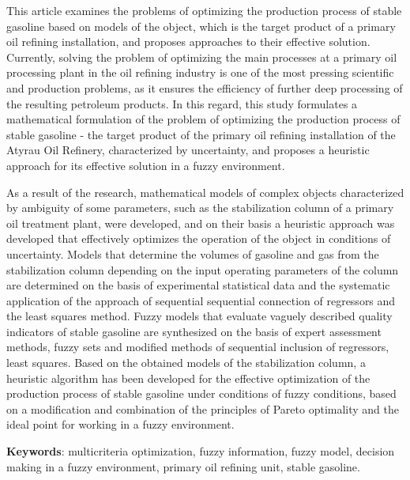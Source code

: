 This article examines the problems of optimizing the production process
of stable gasoline based on models of the object, which is the target
product of a primary oil refining installation, and proposes approaches
to their effective solution. Currently, solving the problem of
optimizing the main processes at a primary oil processing plant in the
oil refining industry is one of the most pressing scientific and
production problems, as it ensures the efficiency of further deep
processing of the resulting petroleum products. In this regard, this
study formulates a mathematical formulation of the problem of optimizing
the production process of stable gasoline - the target product of the
primary oil refining installation of the Atyrau Oil Refinery,
characterized by uncertainty, and proposes a heuristic approach for its
effective solution in a fuzzy environment.

As a result of the research, mathematical models of complex objects
characterized by ambiguity of some parameters, such as the stabilization
column of a primary oil treatment plant, were developed, and on their
basis a heuristic approach was developed that effectively optimizes the
operation of the object in conditions of uncertainty. Models that
determine the volumes of gasoline and gas from the stabilization column
depending on the input operating parameters of the column are determined
on the basis of experimental statistical data and the systematic
application of the approach of sequential sequential connection of
regressors and the least squares method. Fuzzy models that evaluate
vaguely described quality indicators of stable gasoline are synthesized
on the basis of expert assessment methods, fuzzy sets and modified
methods of sequential inclusion of regressors, least squares. Based on
the obtained models of the stabilization column, a heuristic algorithm
has been developed for the effective optimization of the production
process of stable gasoline under conditions of fuzzy conditions, based
on a modification and combination of the principles of Pareto optimality
and the ideal point for working in a fuzzy environment.

{\bfseries Keywords}: multicriteria optimization, fuzzy information, fuzzy
model, decision making in a fuzzy environment, primary oil refining
unit, stable gasoline.

